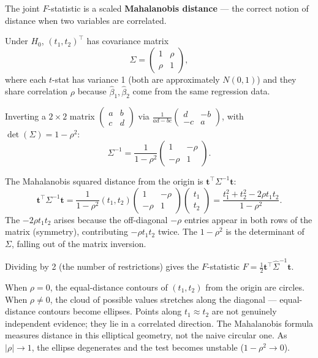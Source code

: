 The joint $F$-statistic is a scaled \textbf{Mahalanobis distance} — the correct notion of distance when two variables are correlated.

Under $H_0$, $(t_1, t_2)^\top$ has covariance matrix
\[
\Sigma = \begin{pmatrix} 1 & \rho \\ \rho & 1 \end{pmatrix},
\]
where each $t$-stat has variance 1 (both are approximately $N(0,1)$) and they share correlation $\rho$ because $\hat\beta_1, \hat\beta_2$ come from the same regression data.

Inverting a $2\times 2$ matrix $\begin{pmatrix}a&b\\c&d\end{pmatrix}$ via $\frac{1}{ad-bc}\begin{pmatrix}d&-b\\-c&a\end{pmatrix}$, with $\det(\Sigma) = 1 - \rho^2$:
\[
\Sigma^{-1} = \frac{1}{1-\rho^2}\begin{pmatrix} 1 & -\rho \\ -\rho & 1 \end{pmatrix}.
\]

The Mahalanobis squared distance from the origin is $\mathbf{t}^\top \Sigma^{-1} \mathbf{t}$:
\[
\mathbf{t}^\top \Sigma^{-1} \mathbf{t}
= \frac{1}{1-\rho^2}(t_1, t_2)\begin{pmatrix}1 & -\rho \\ -\rho & 1\end{pmatrix}\begin{pmatrix}t_1\\t_2\end{pmatrix}
= \frac{t_1^2 + t_2^2 - 2\rho t_1 t_2}{1-\rho^2}.
\]
The $-2\rho t_1 t_2$ arises because the off-diagonal $-\rho$ entries appear in both rows of the matrix (symmetry), contributing $-\rho t_1 t_2$ twice. The $1-\rho^2$ is the determinant of $\Sigma$, falling out of the matrix inversion.

Dividing by 2 (the number of restrictions) gives the $F$-statistic $F = \frac{1}{2}\mathbf{t}^\top \hat\Sigma^{-1}\mathbf{t}$.

\begin{remark}
When $\rho = 0$, the equal-distance contours of $(t_1,t_2)$ from the origin are circles. When $\rho \neq 0$, the cloud of possible values stretches along the diagonal — equal-distance contours become ellipses. Points along $t_1 \approx t_2$ are not genuinely independent evidence; they lie in a correlated direction. The Mahalanobis formula measures distance in this elliptical geometry, not the naive circular one. As $|\rho| \to 1$, the ellipse degenerates and the test becomes unstable ($1-\rho^2 \to 0$).
\end{remark}

